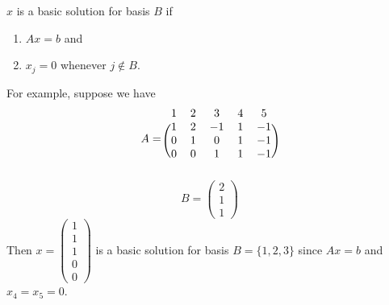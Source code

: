 \begin{definition}
	$x$ is a basic solution for basis $B$ if
	\begin{enumerate}
		\item $Ax = b$ and
		\item $x_j = 0$ whenever $j \not \in B$.
	\end{enumerate}
	For example, suppose we have
	$$A = \begin{blockarray}{ccccc}
			1 & 2 & 3 & 4 & 5 \\
			\begin{block}{(ccccc)}
				1 & 2 & -1 & 1 & -1 \\
				0 & 1 & 0 & 1 & -1 \\
				0 & 0 & 1 & 1 & -1 \\
			\end{block}
		\end{blockarray}$$ $$B = \begin{pmatrix}
			2 \\ 1 \\ 1
		\end{pmatrix}$$ Then $x = \begin{pmatrix}
			1 \\ 1 \\ 1 \\ 0 \\ 0
		\end{pmatrix}$ is a basic solution for basis $B = \{1,2,3\}$ since $Ax = b$ and $x_4 = x_5 = 0$.
\end{definition}
